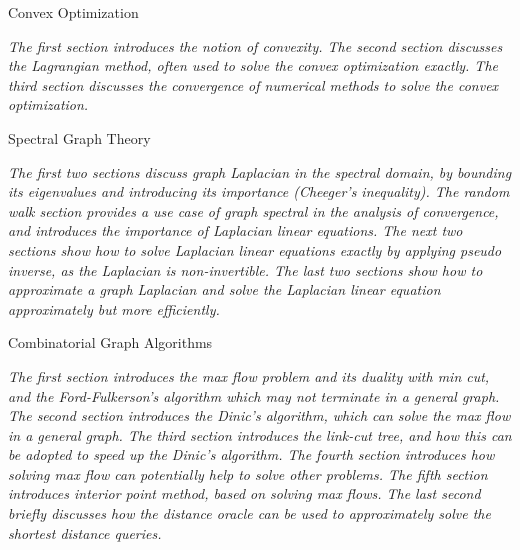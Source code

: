 \documentclass[11pt,landscape,a4paper]{article}
\newcommand{\HEADER}[1]{\begin{tcolorbox}
    \centering
    #1
\end{tcolorbox}}
\begin{document}
\small
\begin{multicols*}{2}


\HEADER{Convex Optimization}

\emph{The first section introduces the notion of convexity. The second section discusses the Lagrangian method, often used to solve the convex optimization exactly. The third section discusses the convergence of numerical methods to solve the convex optimization.}










\HEADER{Spectral Graph Theory}

\emph{The first two sections discuss graph Laplacian in the spectral domain, by bounding its eigenvalues and introducing its importance (Cheeger's inequality). The random walk section provides a use case of graph spectral in the analysis of convergence, and introduces the importance of Laplacian linear equations. The next two sections show how to solve Laplacian linear equations exactly by applying pseudo inverse, as the Laplacian is non-invertible. The last two sections show how to approximate a graph Laplacian and solve the Laplacian linear equation approximately but more efficiently.}
















\HEADER{Combinatorial Graph Algorithms}

\emph{The first section introduces the max flow problem and its duality with min cut, and the Ford-Fulkerson's algorithm which may not terminate in a general graph. The second section introduces the Dinic's algorithm, which can solve the max flow in a general graph. The third section introduces the link-cut tree, and how this can be adopted to speed up the Dinic's algorithm. The fourth section introduces how solving max flow can potentially help to solve other problems. The fifth section introduces interior point method, based on solving max flows. The last second briefly discusses how the distance oracle can be used to approximately solve the shortest distance queries.}


\end{multicols*}
\end{document}
